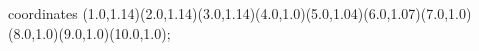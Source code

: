 					coordinates { (1.0,1.14)(2.0,1.14)(3.0,1.14)(4.0,1.0)(5.0,1.04)(6.0,1.07)(7.0,1.0)(8.0,1.0)(9.0,1.0)(10.0,1.0)};